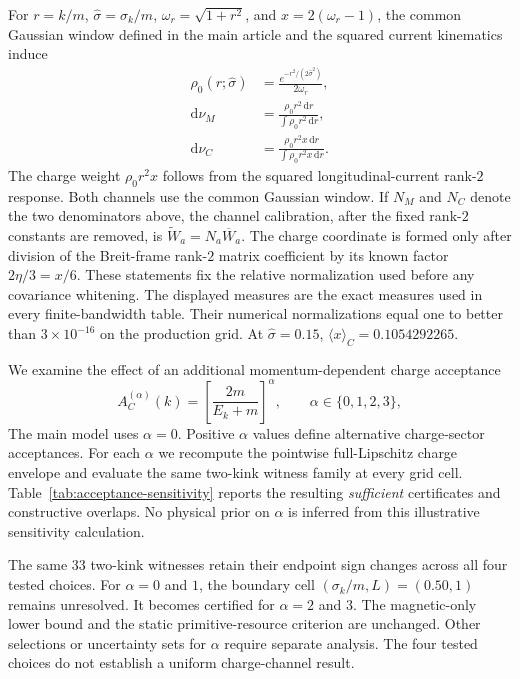 \documentclass[12pt]{iopjournal}
\newcommand{\dd}{\mathrm d}
\begin{document}
For $r=k/m$, $\widehat\sigma=\sigma_k/m$, $\omega_r=\sqrt{1+r^2}$, and $x=2(\omega_r-1)$, the common Gaussian window defined in the main article and the squared current kinematics induce
\begin{align}
\rho_0(r;\widehat\sigma)&=
\frac{e^{-r^2/(2\widehat\sigma^2)}}{2\omega_r},\\
\dd\nu_M&=\frac{\rho_0 r^2\,\dd r}{\int\rho_0 r^2\,\dd r},\\
\dd\nu_C&=\frac{\rho_0r^2x\,\dd r}
{\int\rho_0r^2x\,\dd r}.
\end{align}
The charge weight $\rho_0r^2x$ follows from the squared longitudinal-current rank-$2$ response. Both channels use the common Gaussian window. If $N_M$ and $N_C$ denote the two denominators above, the channel calibration, after the fixed rank-$2$ constants are removed, is $\widetilde W_a=N_a\overline W_a$. The charge coordinate is formed only after division of the Breit-frame rank-$2$ matrix coefficient by its known factor $2\eta/3=x/6$. These statements fix the relative normalization used before any covariance whitening. The displayed measures are the exact measures used in every finite-bandwidth table. Their numerical normalizations equal one to better than $3\times10^{-16}$ on the production grid. At $\widehat\sigma=0.15$, $\langle x\rangle_C=0.1054292265$.

We examine the effect of an additional momentum-dependent charge acceptance
\begin{equation}
A_C^{(\alpha)}(k)=\left[\frac{2m}{E_k+m}\right]^\alpha,
\qquad \alpha\in\{0,1,2,3\},
\label{eq:acceptance-family}
\end{equation}
The main model uses $\alpha=0$. Positive $\alpha$ values define alternative charge-sector acceptances. For each $\alpha$ we recompute the pointwise full-Lipschitz charge envelope and evaluate the same two-kink witness family at every grid cell. Table~\ref{tab:acceptance-sensitivity} reports the resulting \emph{sufficient} certificates and constructive overlaps. No physical prior on $\alpha$ is inferred from this illustrative sensitivity calculation.

The same 33 two-kink witnesses retain their endpoint sign changes across all four tested choices. For $\alpha=0$ and $1$, the boundary cell $(\sigma_k/m,L)=(0.50,1)$ remains unresolved. It becomes certified for $\alpha=2$ and $3$. The magnetic-only lower bound and the static primitive-resource criterion are unchanged. Other selections or uncertainty sets for $\alpha$ require separate analysis. The four tested choices do not establish a uniform charge-channel result.
\end{document}
